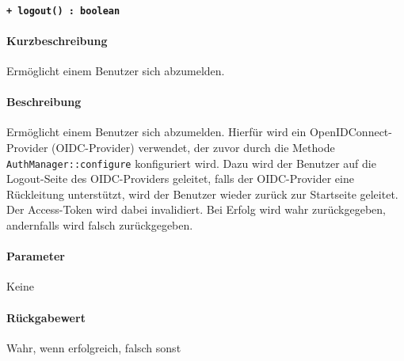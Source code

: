 \paragraph{\texttt{+ logout() : boolean}}\label{AP_AuthManager_logout}%
\paragraph*{Kurzbeschreibung}
Ermöglicht einem Benutzer sich abzumelden.
\paragraph*{Beschreibung}
Ermöglicht einem Benutzer sich abzumelden.
Hierfür wird ein OpenIDConnect-Provider (OIDC-Provider) verwendet, der zuvor durch die Methode \verb#AuthManager::configure# konfiguriert wird.
Dazu wird der Benutzer auf die Logout-Seite des OIDC-Providers geleitet, falls der OIDC-Provider eine Rückleitung unterstützt, wird der Benutzer wieder zurück zur Startseite geleitet.
Der Access-Token wird dabei invalidiert.
Bei Erfolg wird wahr zurückgegeben, andernfalls wird falsch zurückgegeben.
\paragraph*{Parameter}
Keine
\paragraph*{Rückgabewert}
Wahr, wenn erfolgreich, falsch sonst
